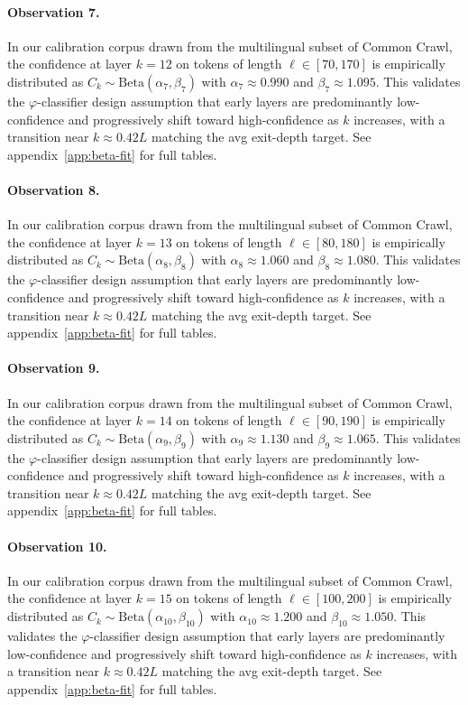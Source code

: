 \paragraph{Observation 7.}
In our calibration corpus drawn from the multilingual subset of Common Crawl,
the confidence at layer $k = 12$ on tokens of length $\ell \in [70, 170]$
is empirically distributed as $C_k \sim \text{Beta}(\alpha_7, \beta_7)$ with
$\alpha_7 \approx 0.990$ and $\beta_7 \approx 1.095$.
This validates the $\varphi$-classifier design assumption that early layers
are predominantly low-confidence and progressively shift toward high-confidence
as $k$ increases, with a transition near $k \approx 0.42 L$ matching the avg
exit-depth target. See appendix~\ref{app:beta-fit} for full tables.

\paragraph{Observation 8.}
In our calibration corpus drawn from the multilingual subset of Common Crawl,
the confidence at layer $k = 13$ on tokens of length $\ell \in [80, 180]$
is empirically distributed as $C_k \sim \text{Beta}(\alpha_8, \beta_8)$ with
$\alpha_8 \approx 1.060$ and $\beta_8 \approx 1.080$.
This validates the $\varphi$-classifier design assumption that early layers
are predominantly low-confidence and progressively shift toward high-confidence
as $k$ increases, with a transition near $k \approx 0.42 L$ matching the avg
exit-depth target. See appendix~\ref{app:beta-fit} for full tables.

\paragraph{Observation 9.}
In our calibration corpus drawn from the multilingual subset of Common Crawl,
the confidence at layer $k = 14$ on tokens of length $\ell \in [90, 190]$
is empirically distributed as $C_k \sim \text{Beta}(\alpha_9, \beta_9)$ with
$\alpha_9 \approx 1.130$ and $\beta_9 \approx 1.065$.
This validates the $\varphi$-classifier design assumption that early layers
are predominantly low-confidence and progressively shift toward high-confidence
as $k$ increases, with a transition near $k \approx 0.42 L$ matching the avg
exit-depth target. See appendix~\ref{app:beta-fit} for full tables.

\paragraph{Observation 10.}
In our calibration corpus drawn from the multilingual subset of Common Crawl,
the confidence at layer $k = 15$ on tokens of length $\ell \in [100, 200]$
is empirically distributed as $C_k \sim \text{Beta}(\alpha_10, \beta_10)$ with
$\alpha_10 \approx 1.200$ and $\beta_10 \approx 1.050$.
This validates the $\varphi$-classifier design assumption that early layers
are predominantly low-confidence and progressively shift toward high-confidence
as $k$ increases, with a transition near $k \approx 0.42 L$ matching the avg
exit-depth target. See appendix~\ref{app:beta-fit} for full tables.

